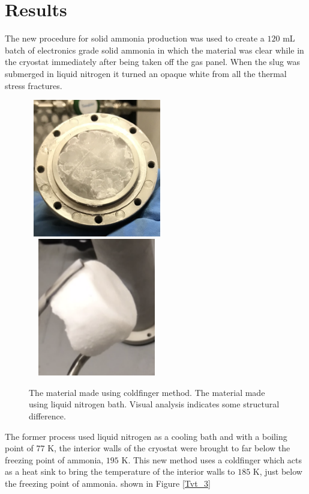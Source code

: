 \documentclass[12pt,notitlepage]{amsart}
\begin{document}
  \section{Results}
  The new procedure for solid ammonia production was used to create a $120$ mL batch of electronics grade solid ammonia in which the material was clear while in the cryostat immediately after being taken off the gas panel. When the slug was submerged in liquid nitrogen it turned an opaque white from all the thermal stress fractures. 
\begin{figure}[h]
 \caption{The material made using coldfinger method. The material made using liquid nitrogen bath. Visual analysis indicates some structural difference. }
 \label{mat}
 \centering
  \includegraphics[width = 6cm,height = 6cm]{NH3_CF} 
  \includegraphics[width = 6cm,height = 6cm]{NH3_LN2} 
\end{figure}

The former process used liquid nitrogen as a cooling bath and with a boiling point of  $77$ K, the interior walls of the cryostat were brought to far below the freezing point of ammonia, $195$ K. This new method uses a coldfinger which acts as a heat sink to bring the temperature of the interior walls to $185$ K, just below the freezing point of ammonia. shown in Figure \ref{Tvt_3}
\end{document}
